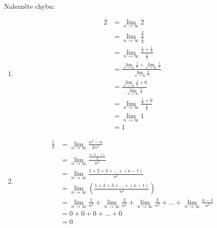 Nalezněte chybu:

\begin{enumerate}

	\item
		\begin{align}
				2 &= \lim_{n \rightarrow \infty} 2 \\
				&= \lim_{n \rightarrow \infty} \frac{\frac{2}{n}}{\frac{1}{n}} \\
				&= \lim_{n \rightarrow \infty} \frac{\frac{1}{n} + \frac{1}{n}}{\frac{1}{n}} \\
				&= \frac{\lim_{n \rightarrow \infty} \frac{1}{n} + \lim_{n \rightarrow \infty} \frac{1}{n}}{\lim_{n \rightarrow \infty} \frac{1}{n}} \label{cv4:chyba_a_A} \\
				&= \frac{\lim_{n \rightarrow \infty} \frac{1}{n} + 0}{\lim_{n \rightarrow \infty} \frac{1}{n}} \\
				&= \lim_{n \rightarrow \infty} \frac{\frac{1}{n} + 0}{\frac{1}{n}} \label{cv4:chyba_a_B} \\
				&= \lim_{n \rightarrow \infty} 1 \\
				&= 1
			\label{cv4:chyba_a}
		\end{align}

	
	\item
		\begin{align}
			\frac{1}{2} &= \lim_{n \rightarrow \infty} \frac{n^2 - n}{2n^2} \\
			&= \lim_{n \rightarrow \infty} \frac{\frac{n(n-1)}{2}}{n^2} \\
			&= \lim_{n \rightarrow \infty} \frac{1 + 2 + 3 + \dots + (n-1)}{n^2} \\
			&= \lim_{n \rightarrow \infty} \left( \frac{1 + 2 + 3 + \dots + (n-1)}{n^2} \right) \\
			&= \lim_{n \rightarrow \infty} \frac{1}{n^2} + \lim_{n \rightarrow \infty}\frac{2}{n^2} + \lim_{n \rightarrow \infty}\frac{3}{n^2} + \dots + \lim_{n \rightarrow \infty}\frac{n-1}{n^2} \label{cv4:chyba_b_here} \\
			&= 0 + 0 + 0 + \dots + 0 \\
			&= 0
			\label{cv4:chyba_b}
		\end{align}

	

\end{enumerate}
